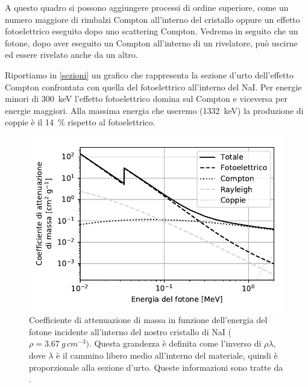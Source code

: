 A questo quadro si possono aggiungere processi di ordine superiore, come un numero maggiore di rimbalzi Compton all'interno del cristallo oppure un effetto fotoelettrico eseguito dopo uno scattering Compton.
Vedremo in seguito che un fotone, dopo aver eseguito un Compton all'interno di un rivelatore, può uscirne ed essere rivelato anche da un altro.

Riportiamo in \autoref{sezioni} un grafico che rappresenta la sezione d'urto dell'effetto Compton confrontata con quella del fotoelettrico all'interno del NaI. Per energie minori di \SI{300}{keV} l'effetto fotoelettrico domina sul Compton e viceversa per energie maggiori.
Alla massima energia che useremo (\SI{1332} {keV}) la produzione di coppie è il \SI{14}{\%} rispetto al fotoelettrico.

\begin{figure}[h]
\centering
\includegraphics[width=25 em]{immagini/cross}
\caption{\label{fig:cross}
Coefficiente di attenuazione di massa in funzione dell'energia del fotone incidente all'interno del nostro cristallo di NaI ($\rho=\SI{3.67}{g\,cm^{-3}})$. Questa grandezza è definita come l'inverso di $\rho\lambda$, dove $\lambda$ è il cammino libero medio all'interno del materiale, quindi è proporzionale alla sezione d'urto. Queste informazioni sono tratte da \cite{cross}.}
\label{sezioni}
\end{figure}
